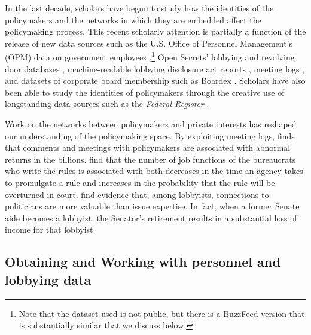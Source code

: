 \documentclass[
      12pt,
        ]{article}
\begin{document}
In the last decade, scholars have begun to study how the identities of
the policymakers and the networks in which they are embedded affect the
policymaking process. This recent scholarly attention is partially a
function of the release of new data sources such as the U.S. Office of
Personnel Management's (OPM) data on government employees
\citep[e.g.,][]{BoltonAMP2018},\footnote{Note that the dataset
  \citet{BoltonAMP2018} used is not public, but there is a BuzzFeed
  version that is substantially similar that we discuss below.} Open
Secrets' lobbying \citep[e.g.,][]{Baumgartner2009} and revolving door
databases \citep[e.g.,][\citet{BertrandAER2014}]{VidalAER2012},
machine-readable lobbying disclosure act reports
\citep[e.g.,][\citet{YouJOP2017}]{BoehmkeJPP2013}, meeting logs
\citep{LibgoberQJPS}, and datasets of corporate board membership such as
Boardex \citep[e.g.,][]{ShiveROF2016}. Scholars have also been able to
study the identities of policymakers through the creative use of
longstanding data sources such as the \emph{Federal Register}
\citep[e.g.,][]{CarriganPAR2019}.

Work on the networks between policymakers and private interests has
reshaped our understanding of the policymaking space. By exploiting
meeting logs, \citet{LibgoberQJPS} finds that comments and meetings with
policymakers are associated with abnormal returns in the billions.
\citet{CarriganPAR2019} find that the number of job functions of the
bureaucrats who write the rules is associated with both decreases in the
time an agency takes to promulgate a rule and increases in the
probability that the rule will be overturned in court.
\citet{VidalAER2012} find evidence that, among lobbyists, connections to
politicians are more valuable than issue expertise. In fact, when a
former Senate aide becomes a lobbyist, the Senator's retirement results
in a substantial loss of income for that lobbyist.

\hypertarget{obtaining-and-working-with-personnel-and-lobbying-data}{%
\subsection*{Obtaining and Working with personnel and lobbying
data}\label{obtaining-and-working-with-personnel-and-lobbying-data}}
\end{document}
